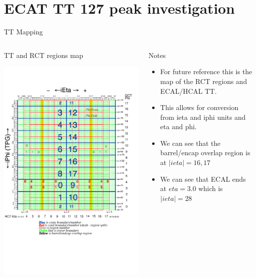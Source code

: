 \documentclass[8pt]{beamer}
\begin{document}
\section{ECAT TT 127 peak investigation}

\begin{frame}{TT Mapping}

\begin{columns}
 
\begin{block}{TT and RCT regions map}
\centering

\includegraphics[width=0.8\linewidth]{fig/towers_ieta_iphi_2009.png}

\end{block}

\begin{block}{Notes}
\centering

\begin{itemize}
 \item For future reference this is the map of the RCT regions and ECAL/HCAL TT.
 \item This allows for conversion from ieta and iphi units and eta and phi.
 \item We can see that the barrel/encap overlap region is at $|ieta|=16,17$
 \item We can see that ECAL ends at $eta=3.0$ which is $|ieta|=28$
\end{itemize}

\end{block}

\end{columns}

\end{frame}
\end{document}
